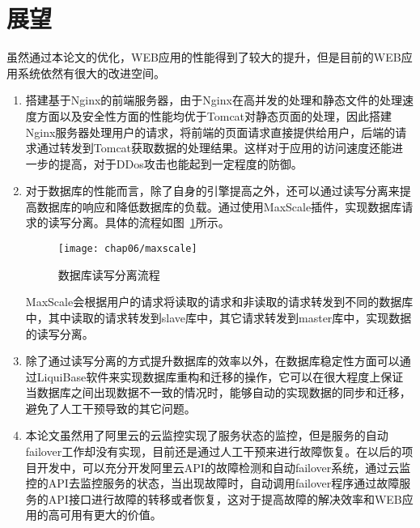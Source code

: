 
\section{展望}

虽然通过本论文的优化，WEB应用的性能得到了较大的提升，但是目前的WEB应用系统依然有很大的改进空间。
\begin{enumerate}

\item 搭建基于Nginx的前端服务器，由于Nginx在高并发的处理和静态文件的处理速度方面以及安全性方面的性能均优于Tomcat对静态页面的处理，因此搭建Nginx服务器处理用户的请求，将前端的页面请求直接提供给用户，后端的请求通过转发到Tomcat获取数据的处理结果。这样对于应用的访问速度还能进一步的提高，对于DDos攻击也能起到一定程度的防御\cite{reese2008nginx}。

\item 对于数据库的性能而言，除了自身的引擎提高之外，还可以通过读写分离来提高数据库的响应和降低数据库的负载\cite{刘进京2016mysql}。通过使用MaxScale插件，实现数据库请求的读写分离。具体的流程如图~\ref{fig:maxscale}所示。

\begin{figure}[H] %
  \centering
  \texttt{[image: chap06/maxscale]}
  \caption{数据库读写分离流程}
  \label{fig:maxscale}
\end{figure}

MaxScale会根据用户的请求将读取的请求和非读取的请求转发到不同的数据库中，其中读取的请求转发到slave库中，其它请求转发到master库中，实现数据的读写分离。

\item 除了通过读写分离的方式提升数据库的效率以外，在数据库稳定性方面可以通过LiquiBase软件来实现数据库重构和迁移的操作，它可以在很大程度上保证当数据库之间出现数据不一致的情况时，能够自动的实现数据的同步和迁移，避免了人工干预导致的其它问题。

\item 本论文虽然用了阿里云的云监控实现了服务状态的监控，但是服务的自动failover工作却没有实现，目前还是通过人工干预来进行故障恢复。在以后的项目开发中，可以充分开发阿里云API的故障检测和自动failover系统，通过云监控的API去监控服务的状态，当出现故障时，自动调用failover程序通过故障服务的API接口进行故障的转移或者恢复，这对于提高故障的解决效率和WEB应用的高可用有更大的价值。

\end{enumerate}